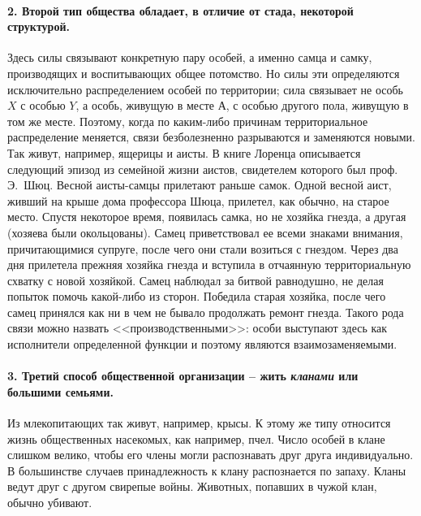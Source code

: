 \documentclass{book}
\begin{document}
\paragraph{2. Второй тип общества обладает, в отличие от стада, неко­торой структурой.} Здесь силы связывают конкретную пару 
особей, а именно самца и самку, производящих и воспитываю­щих общее потомство. Но силы эти определяются исключитель­но 
распределением особей по территории; сила связывает не особь $X$  с особью $Y$, а особь, живущую в месте $А$, с особью другого 
пола, живущую в том же месте. Поэтому, когда по каким-либо причинам территориальное распределение меняет­ся, связи безболезненно 
разрываются и заменяются новыми. Так живут, например, ящерицы и аисты. В книге Лоренца описы­вается следующий эпизод из семейной 
жизни аистов, свидете­лем которого был проф. Э.~Шюц. Весной аисты-самцы прилетают раньше самок. Одной весной аист, живший на 
крыше дома профессора Шюца, прилетел, как обычно, на старое место. Спустя некоторое время, появилась самка, но не хозяйка 
гнезда, а другая (хозяева были окольцованы). Самец приветствовал ее всеми знаками внимания, причитающимися супруге, после чего 
они стали возиться с гнездом. Через два дня прилетела прежняя хозяйка гнезда и вступила в отчаянную территориальную схватку с 
новой хозяйкой. Самец наблюдал за битвой равнодушно, не делая попыток помочь какой-либо из сторон. Победила старая хозяйка, 
после чего самец принялся как ни в чем не бывало продолжать ремонт гнезда. Такого рода связи можно назвать 
<<производственными>>: особи выступают здесь как исполнители определенной функции и поэтому являются взаимозаменяемыми.

\paragraph{3. Третий способ общественной организации -- жить \textit{клана­ми}  или большими семьями.} Из млекопитающих так 
живут, например, крысы. К этому же типу относится жизнь обществен­ных насекомых, как например, пчел. Число особей в клане слишком 
велико, чтобы его члены могли распознавать друг друга индивидуально. В большинстве случаев принадлежность к клану распознается 
по запаху. Кланы ведут друг с другом свирепые войны. Животных, попавших в чужой клан, обычно убивают.
\end{document}
